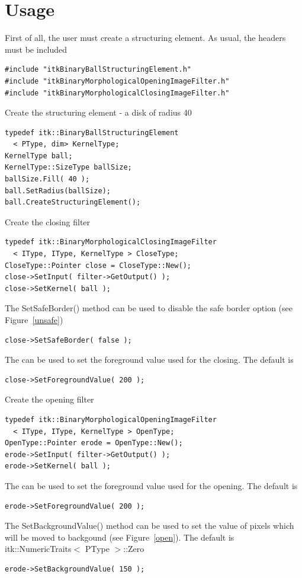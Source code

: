 \documentclass{InsightArticle}
\begin{document}
\section{Usage}

First of all, the user must create a structuring element. As usual, the headers
must be included

\small \begin{verbatim}
#include "itkBinaryBallStructuringElement.h"
#include "itkBinaryMorphologicalOpeningImageFilter.h"
#include "itkBinaryMorphologicalClosingImageFilter.h"
\end{verbatim} \normalsize
Create the structuring element - a disk of radius 40
\small \begin{verbatim}
typedef itk::BinaryBallStructuringElement
  < PType, dim> KernelType;
KernelType ball;
KernelType::SizeType ballSize;
ballSize.Fill( 40 );
ball.SetRadius(ballSize);
ball.CreateStructuringElement();
\end{verbatim} \normalsize
Create the closing filter
\small \begin{verbatim}
typedef itk::BinaryMorphologicalClosingImageFilter
  < IType, IType, KernelType > CloseType;
CloseType::Pointer close = CloseType::New();
close->SetInput( filter->GetOutput() );
close->SetKernel( ball );
\end{verbatim} \normalsize
The SetSafeBorder() method can be used to disable the safe border option (see
Figure~\ref{unsafe})
\small \begin{verbatim}
close->SetSafeBorder( false );
\end{verbatim} \normalsize
The  can be used to set the foreground value used for
the closing. The default is 
\small \begin{verbatim}
close->SetForegroundValue( 200 );
\end{verbatim} \normalsize
Create the opening filter
\small \begin{verbatim}
typedef itk::BinaryMorphologicalOpeningImageFilter
  < IType, IType, KernelType > OpenType;
OpenType::Pointer erode = OpenType::New();
erode->SetInput( filter->GetOutput() );
erode->SetKernel( ball );
\end{verbatim} \normalsize
The  can be used to set the foreground value used for
the opening. The default is 
\small \begin{verbatim}
erode->SetForegroundValue( 200 );
\end{verbatim} \normalsize
The SetBackgroundValue() method can be used to set the value of pixels which
will be moved to backgound (see Figure~\ref{open}). The default is
itk::NumericTraits$<$ PType $>$::Zero
\small \begin{verbatim}
erode->SetBackgroundValue( 150 );
\end{verbatim} \normalsize
\end{document}

